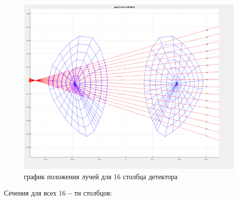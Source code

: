 \documentclass[a4]{article}
\begin{document}
\begin{figure}[H]
\begin{center}
\caption{график положения лучей для 16 столбца детектора}
\includegraphics{pic5.png} 
\end{center}
\end{figure}

Сечения для всех $16-$ти столбцов:
\end{document}
